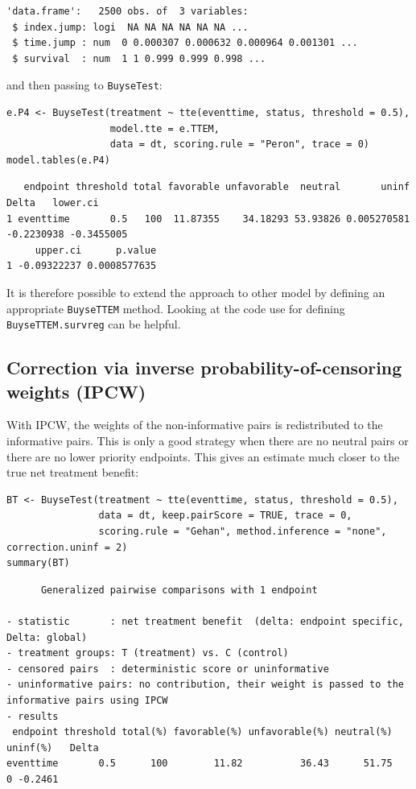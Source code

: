 \documentclass[12pt]{article}
\begin{document}
\begin{verbatim}
'data.frame':	2500 obs. of  3 variables:
 $ index.jump: logi  NA NA NA NA NA NA ...
 $ time.jump : num  0 0.000307 0.000632 0.000964 0.001301 ...
 $ survival  : num  1 1 0.999 0.999 0.998 ...
\end{verbatim}


and then passing to \texttt{BuyseTest}:
\lstset{language=r,label= ,caption= ,captionpos=b,numbers=none}
\begin{lstlisting}
e.P4 <- BuyseTest(treatment ~ tte(eventtime, status, threshold = 0.5),
                  model.tte = e.TTEM,
                  data = dt, scoring.rule = "Peron", trace = 0)
model.tables(e.P4)
\end{lstlisting}

\begin{verbatim}
   endpoint threshold total favorable unfavorable  neutral       uninf      Delta   lower.ci
1 eventtime       0.5   100  11.87355    34.18293 53.93826 0.005270581 -0.2230938 -0.3455005
     upper.ci      p.value
1 -0.09322237 0.0008577635
\end{verbatim}


It is therefore possible to extend the approach to other model by
defining an appropriate \texttt{BuyseTTEM} method. Looking at the code use
for defining \texttt{BuyseTTEM.survreg} can be helpful.

\subsection{Correction via inverse probability-of-censoring weights (IPCW)}
\label{sec:orgf9add3a}

With IPCW, the weights of the non-informative pairs is redistributed
to the informative pairs. This is only a good strategy when there are
no neutral pairs or there are no lower priority endpoints. This gives
an estimate much closer to the true net treatment benefit:
\lstset{language=r,label= ,caption= ,captionpos=b,numbers=none}
\begin{lstlisting}
BT <- BuyseTest(treatment ~ tte(eventtime, status, threshold = 0.5),
                data = dt, keep.pairScore = TRUE, trace = 0,
                scoring.rule = "Gehan", method.inference = "none", correction.uninf = 2)
summary(BT)
\end{lstlisting}

\begin{verbatim}
      Generalized pairwise comparisons with 1 endpoint

- statistic       : net treatment benefit  (delta: endpoint specific, Delta: global) 
- treatment groups: T (treatment) vs. C (control) 
- censored pairs  : deterministic score or uninformative
- uninformative pairs: no contribution, their weight is passed to the informative pairs using IPCW
- results
 endpoint threshold total(%) favorable(%) unfavorable(%) neutral(%) uninf(%)   Delta
eventtime       0.5      100        11.82          36.43      51.75        0 -0.2461
\end{verbatim}
\end{document}
